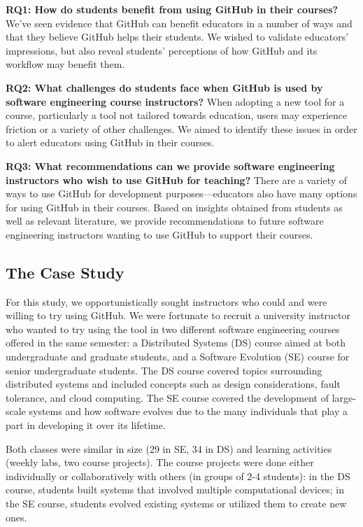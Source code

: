 \textbf{RQ1: How do students benefit from using GitHub in their courses?} We've seen evidence that GitHub can benefit educators in a number of ways \cite{zagalsky2015emergence} and that they believe GitHub helps their students. We wished to validate educators' impressions, but also reveal students' perceptions of how GitHub and its workflow may benefit them.

\textbf{RQ2: What challenges do students face when GitHub is used by software engineering course instructors?} When adopting a new tool for a course, particularly a tool not tailored towards education, users may experience friction or a variety of other challenges. We aimed to identify these issues in order to alert educators using GitHub in their courses.

\textbf{RQ3: What recommendations can we provide software engineering instructors who wish to use GitHub for teaching?} There are a variety of ways to use GitHub for development purposes---educators also have many options for using GitHub in their courses. Based on insights obtained from students as well as relevant literature, we provide recommendations to future software engineering instructors wanting to use GitHub to support their courses.

\subsection{The Case Study}
For this study, we opportunistically sought instructors who could and were willing to try using GitHub. We were fortunate to recruit a university instructor who wanted to try using the tool in two different software engineering courses offered in the same semester: a Distributed Systems (DS) course aimed at both undergraduate and graduate students, and a Software Evolution (SE) course for senior undergraduate students. The DS course covered topics surrounding distributed systems and included concepts such as design considerations, fault tolerance, and cloud computing. The SE course covered the development of large-scale systems and how software evolves due to the many individuals that play a part in developing it over its lifetime.

Both classes were similar in size (29 in SE, 34 in DS) and learning activities (weekly labs, two course projects). The course projects were done either individually or collaboratively with others (in groups of 2-4 students): in the DS course, students built systems that involved multiple computational devices; in the SE course, students evolved existing systems or utilized them to create new ones.

